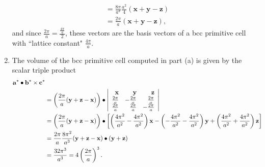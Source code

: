\documentclass{article}
\begin{document}
\begin{enumerate}
{\begin{align*}
                            &= \frac{8 \pi}{a^3} \frac{a^2}{4} 
                               (\mathbf{x} + \mathbf{y} - \mathbf{z}) \\
                            &= \frac{2 \pi}{a}(\mathbf{x} + \mathbf{y} - \mathbf{z}),
        \end{align*}
        and since $\frac{2\pi}{a} = \frac{\frac{4\pi}{a}}{2}$, these vectors
        are the basis vectors of a bcc primitive cell with ``lattice constant"
        $\frac{4\pi}{a}$.
       }
       \item{
         The volume of the bcc primitive cell computed in part (a) is given by
         the scalar triple product
         \begin{align*}
         \mathbf{a}^{\ast} \bullet \mathbf{b}^{\ast} \times \mathbf{c}^{\ast} \\
         &= \left(\frac{2\pi}{a}(\mathbf{y} + \mathbf{z} - \mathbf{x})\right) \bullet 
            \left|\begin{array}{r r r}
            \mathbf{x}     &  \mathbf{y}     &  \mathbf{z}     \\
            \frac{2\pi}{a} & -\frac{2\pi}{a} &  \frac{2\pi}{a} \\
            \frac{2\pi}{a} &  \frac{2\pi}{a} & -\frac{2\pi}{a} \\
            \end{array}\right| \\
         &= \left(\frac{2\pi}{a}(\mathbf{y} + \mathbf{z} - \mathbf{x})\right) \bullet
            \left[\left(\frac{4\pi^2}{a^2} - \frac{4 \pi^2}{a^2}\right)\mathbf{x}
                - \left(-\frac{4\pi^2}{a^2} - \frac{4 \pi^2}{a^2}\right)\mathbf{y}
                + \left(\frac{4\pi^2}{a^2} + \frac{4 \pi^2}{a^2}\right)\mathbf{z}\right] \\
         &= \frac{2\pi}{a}\frac{8 \pi^{2}}{a^3}(\mathbf{y} + \mathbf{z} - \mathbf{x}) \bullet
                            (\mathbf{y} + \mathbf{z}) \\
         &= \frac{32 \pi^{3}}{a^3} = 4 \left(\frac{2\pi}{a}\right)^3.
         \end{align*}
       }
\end{enumerate}

\pagebreak 
\end{document}
